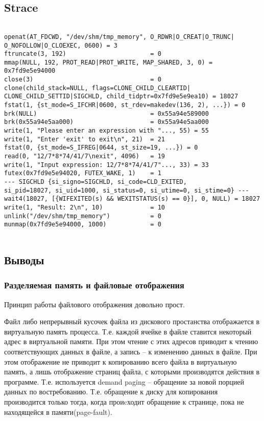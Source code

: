 \documentclass[12pt]{article}
\begin{document}
\subsection*{Strace}
\begin{verbatim}

openat(AT_FDCWD, "/dev/shm/tmp_memory", O_RDWR|O_CREAT|O_TRUNC|
O_NOFOLLOW|O_CLOEXEC, 0600) = 3
ftruncate(3, 192)                       = 0
mmap(NULL, 192, PROT_READ|PROT_WRITE, MAP_SHARED, 3, 0) = 0x7fd9e5e94000
close(3)                                = 0
clone(child_stack=NULL, flags=CLONE_CHILD_CLEARTID|
CLONE_CHILD_SETTID|SIGCHLD, child_tidptr=0x7fd9e5e9ea10) = 18027
fstat(1, {st_mode=S_IFCHR|0600, st_rdev=makedev(136, 2), ...}) = 0
brk(NULL)                               = 0x55a94e589000
brk(0x55a94e5aa000)                     = 0x55a94e5aa000
write(1, "Please enter an expression with "..., 55) = 55
write(1, "Enter 'exit' to exit\n", 21)  = 21
fstat(0, {st_mode=S_IFREG|0644, st_size=19, ...}) = 0
read(0, "12/7*8*74/41/7\nexit", 4096)   = 19
write(1, "Input expression: 12/7*8*74/41/7"..., 33) = 33
futex(0x7fd9e5e94020, FUTEX_WAKE, 1)    = 1
--- SIGCHLD {si_signo=SIGCHLD, si_code=CLD_EXITED, 
si_pid=18027, si_uid=1000, si_status=0, si_utime=0, si_stime=0} ---
wait4(18027, [{WIFEXITED(s) && WEXITSTATUS(s) == 0}], 0, NULL) = 18027
write(1, "Result: 2\n", 10)             = 10
unlink("/dev/shm/tmp_memory")           = 0
munmap(0x7fd9e5e94000, 1000)            = 0
    
\end{verbatim}

\subsection*{Выводы}
\subsubsection*{Разделяемая память и файловые отображения}Принцип работы файлового отображения довольно прост.

        Файл либо непрерывный кусочек файла из дискового простанства отображается в виртуальную память процесса. Т.е. каждой ячейке в файле ставится некоторый адрес в виртуальной памяти. При этом чтение с этих адресов приводит к чтению соответствующих данных в файле, а запись -- к изменению данных в файле.
        При этом отображение не приводит к копированию всего файла в виртуальную память, а лишь отображение страниц файла, с которыми производятся действия в программе.
        Т.е. используется demand paging -- обращение за новой порцией данных по востребованию. Т.е. обращение к диску для копирования производится только тогда, когда проиcходит обращение к странице, пока не находящейся в памяти(page-fault).
       
\end{document}
